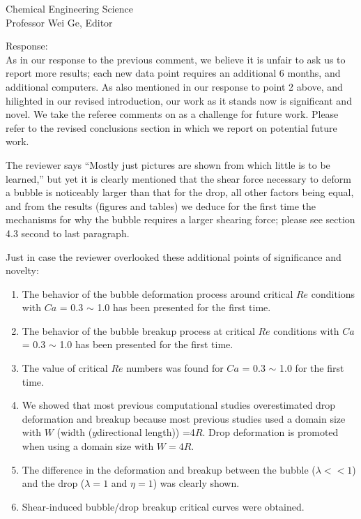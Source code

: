\documentclass{letter}
\begin{document}
\begin{letter}{
Chemical Engineering Science\\
Professor Wei Ge, Editor\\}
\begin{enumerate}
Response: \\
As in our response to the previous comment, we believe it is unfair to ask us to  report more results; each new data point requires an additional 6 months, and additional computers.  As also mentioned in our response to point 2 above, and hilighted in our revised introduction, our work as it stands now is significant and novel.  We take the referee comments on as a challenge for future work.  Please refer to the revised conclusions section in which we report on potential future work.

The reviewer says ``Mostly just pictures are shown from which little is to be learned,''  but yet it is clearly mentioned that the shear force necessary to deform a bubble is noticeably larger than that for the drop, all other factors being equal, and from the results (figures and tables) we deduce for the first time the mechanisms for why the bubble requires a larger shearing force; please see section 4.3 second to last paragraph.

Just in case the reviewer overlooked these additional points of significance and novelty:
\begin{enumerate}
\item The behavior of the bubble deformation process around critical $Re$ conditions with $Ca$ = 0.3  $\sim$ 1.0 has been presented for the first time.
\item The behavior of the bubble breakup process at critical $Re$ conditions with $Ca$ = 0.3  $\sim$ 1.0 has been presented for the first time.
\item The value of critical $Re$ numbers was found for $Ca$ = 0.3  $\sim$ 1.0 for the first time.
\item  We showed that most previous computational studies overestimated drop deformation and breakup because most previous studies used a domain size with $W$ (width ($y$directional length)) =4$R$. Drop deformation is promoted when using a domain size with $W=4R$. 
\item The difference in the deformation and breakup between the bubble ($\lambda<<1$) and the drop ($\lambda = 1$ and $\eta = 1$) was clearly shown.
\item Shear-induced bubble/drop breakup critical curves were obtained. 
\end{enumerate}


\end{enumerate}
\end{letter}
\end{document}

